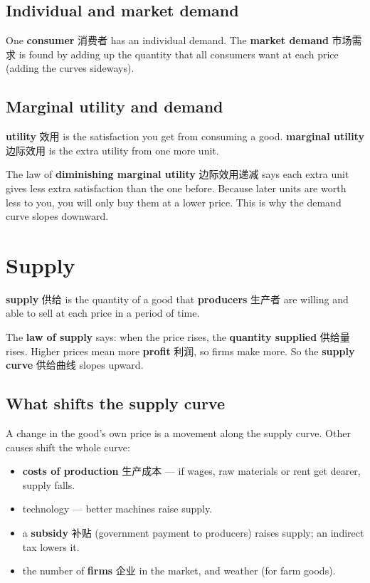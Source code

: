 \documentclass[11pt]{article}
\begin{document}
\subsection*{Individual and market demand}

One \textbf{consumer} 消费者 has an individual demand. The \textbf{market demand} 市场需求 is found by adding up the quantity that all consumers want at each price (adding the curves sideways).

\subsection*{Marginal utility and demand}

\textbf{utility} 效用 is the satisfaction you get from consuming a good. \textbf{marginal utility} 边际效用 is the extra utility from one more unit.

The law of \textbf{diminishing marginal utility} 边际效用递减 says each extra unit gives less extra satisfaction than the one before. Because later units are worth less to you, you will only buy them at a lower price. This is why the demand curve slopes downward.

\section*{Supply}

\textbf{supply} 供给 is the quantity of a good that \textbf{producers} 生产者 are willing and able to sell at each price in a period of time.

The \textbf{law of supply} says: when the price rises, the \textbf{quantity supplied} 供给量 rises. Higher prices mean more \textbf{profit} 利润, so firms make more. So the \textbf{supply curve} 供给曲线 slopes upward.

\subsection*{What shifts the supply curve}

A change in the good's own price is a movement along the supply curve. Other causes shift the whole curve:

\begin{itemize}
\item \textbf{costs of production} 生产成本 — if wages, raw materials or rent get dearer, supply falls.

\item technology — better machines raise supply.

\item a \textbf{subsidy} 补贴 (government payment to producers) raises supply; an indirect tax lowers it.

\item the number of \textbf{firms} 企业 in the market, and weather (for farm goods).

\end{itemize}
\end{document}
